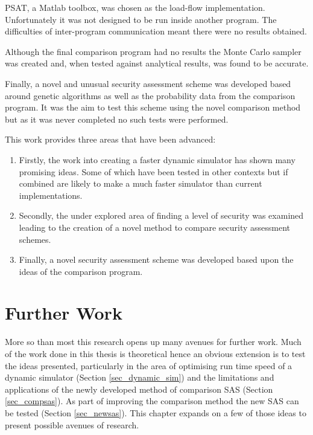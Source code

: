 \documentclass[a4paper,oneside,12pt]{report}
\begin{document}
PSAT, a Matlab toolbox, was chosen as the load-flow implementation. Unfortunately it was not designed to be run inside another program. The difficulties of inter-program communication meant there were no results obtained.

Although the final comparison program had no results the Monte Carlo sampler was created and, when tested against analytical results, was found to be accurate.

Finally, a novel and unusual security assessment scheme was developed based around genetic algorithms as well as the probability data from the comparison program. It was the aim to test this scheme using the novel comparison method but as it was never completed no such tests were performed.

This work provides three areas that have been advanced:

\begin{enumerate}
\item Firstly, the work into creating a faster dynamic simulator has shown many promising ideas. Some of which have been tested in other contexts but if combined are likely to make a much faster simulator than current implementations.
\item Secondly, the under explored area of finding a level of security was examined leading to the creation of a novel method to compare security assessment schemes.
\item Finally, a novel security assessment scheme was developed based upon the ideas of the comparison program.
\end{enumerate}










\chapter{Further Work}

More so than most this research opens up many avenues for further work. Much of the work done in this thesis is theoretical hence an obvious extension is to test the ideas presented, particularly in the area of optimising run time speed of a dynamic simulator (Section \ref{sec_dynamic_sim}) and the limitations and applications of the newly developed method of comparison SAS (Section \ref{sec_compsas}). As part of improving the comparison method the new SAS can be tested (Section \ref{sec_newsas}). This chapter expands on a few of those ideas to present possible avenues of research.
\end{document}
